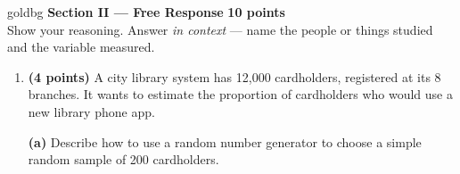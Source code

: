 \documentclass[12pt]{article}
\begin{document}
\vspace{0.14in}

\boxguard[30]
\begin{headlinebox}{goldbg}
\small
\textbf{Section II --- Free Response} \hfill \textbf{10 points}\\
Show your reasoning. Answer \emph{in context} --- name the people or things studied and the
variable measured.
\end{headlinebox}

\vspace{0.10in}

\begin{enumerate}[leftmargin=1.9em, itemsep=0.16in, resume]

  \boxguard[26]
  \item \textbf{(4 points)} A city library system has 12{,}000 cardholders, registered at its 8
        branches. It wants to estimate the proportion of cardholders who would use a new
        library phone app.

        \vspace{6pt}
        \textbf{(a)} Describe how to use a random number generator to choose a simple random
        sample of 200 cardholders.\\[4pt]
        \\
        \\
        \\
        \ansline{}\\
        \ansline{}\\
        \ansline{}\\
        \ansline{}\\
        \ansline{}


\end{enumerate}
\end{document}
